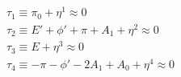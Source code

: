 \begin{equation}
  \begin{array}{l}
  \tau_1 \equiv \pi_0 + \eta^1 \approx 0 \\ \tau_2\equiv
  E' + \phi' + \pi + A_1 +\eta^2 \approx 0 \\ \tau_3 \equiv E + \eta^3 \approx 0 \\
  \tau_4 \equiv -\pi - \phi' - 2A_1 + A_0 + \eta^4 \approx
  0
  \end{array}
  \label{a65}
  \end{equation}

